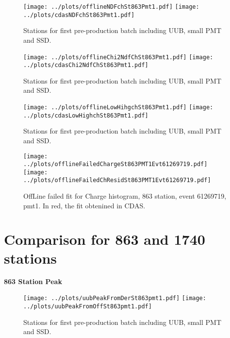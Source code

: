 \documentclass[twoside, final, 10pt]{articleMine}
\begin{document}
\begin{figure}[!tbh]
  \centering
  \subfigure
  {
    \texttt{[image: ../plots/offlineNDFchSt863Pmt1.pdf]}
    \texttt{[image: ../plots/cdasNDFchSt863Pmt1.pdf]}
  }
  \caption{Stations for first pre-production batch including UUB, small PMT and SSD.}
  \label{figChNdfserie}
\end{figure}

\begin{figure}[!tbh]
  \centering
  \subfigure
  {
    \texttt{[image: ../plots/offlineChi2NdfChSt863Pmt1.pdf]}
    \texttt{[image: ../plots/cdasChi2NdfChSt863Pmt1.pdf]}
  }
  \caption{Stations for first pre-production batch including UUB, small PMT and SSD.}
  \label{figChChi2Ndfserie}
\end{figure}
\clearpage


\begin{figure}[!tbh]
  \centering
  \subfigure
  {
    \texttt{[image: ../plots/offlineLowHihgchSt863Pmt1.pdf]}
    \texttt{[image: ../plots/cdasLowHighchSt863Pmt1.pdf]}
  }
  \caption{Stations for first pre-production batch including UUB, small PMT and SSD.}
  \label{figChLowHigh}
\end{figure}

\begin{figure}[!tbh]
  \centering
  \subfigure
  {
    \texttt{[image: ../plots/offlineFailedChargeSt863PMT1Evt61269719.pdf]}
    \texttt{[image: ../plots/offlineFailedChResidSt863PMT1Evt61269719.pdf]}
  }
  \caption{OffLine failed fit for Charge histogram, 863 station, event 61269719, pmt1.
  In red, the fit obtenined in CDAS.}
  \label{figChLowHigh}
\end{figure}
\clearpage

\section*{Comparison for 863 and 1740 stations}

{\bf 863 Station Peak}
\begin{figure}[!tbh]
  \centering
  \subfigure
  {
    \texttt{[image: ../plots/uubPeakFromDerSt863pmt1.pdf]}
    \texttt{[image: ../plots/uubPeakFromOffSt863pmt1.pdf]}
  }
  \caption{Stations for first pre-production batch including UUB, small PMT and SSD.}
  \label{figChLowHigh}
\end{figure}
\end{document}
